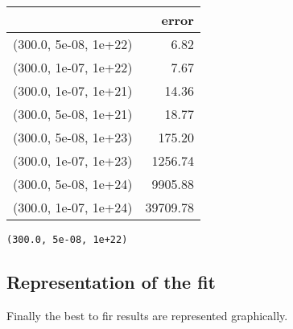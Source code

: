 \documentclass[11pt]{article}
\makeatletter
\newcommand{\boxspacing}{\kern\kvtcb@left@rule\kern\kvtcb@boxsep}
\newcommand{\prompt}[4]{
        \ttfamily\llap{{\color{#2}[#3]:\hspace{3pt}#4}}\vspace{-\baselineskip}
    }
\makeatother
\begin{document}
    
    \begin{center}
    {\begin{tabular}{lr}
\toprule
{} &     error \\
\midrule
(300.0, 5e-08, 1e+22) &      6.82 \\
(300.0, 1e-07, 1e+22) &      7.67 \\
(300.0, 1e-07, 1e+21) &     14.36 \\
(300.0, 5e-08, 1e+21) &     18.77 \\
(300.0, 5e-08, 1e+23) &    175.20 \\
(300.0, 1e-07, 1e+23) &   1256.74 \\
(300.0, 5e-08, 1e+24) &   9905.88 \\
(300.0, 1e-07, 1e+24) &  39709.78 \\
\bottomrule
\end{tabular}
}
    \end{center}
    

    
            \begin{tcolorbox}[breakable, size=fbox, boxrule=.5pt, pad at break*=1mm, opacityfill=0]
\prompt{Out}{outcolor}{336}{\boxspacing}
\begin{Verbatim}[commandchars=\\\{\}]
(300.0, 5e-08, 1e+22)
\end{Verbatim}
\end{tcolorbox}
        
    \hypertarget{representation-of-the-fit}{%
\subsection{Representation of the fit}\label{representation-of-the-fit}}

Finally the best to fir results are represented graphically.
\end{document}
